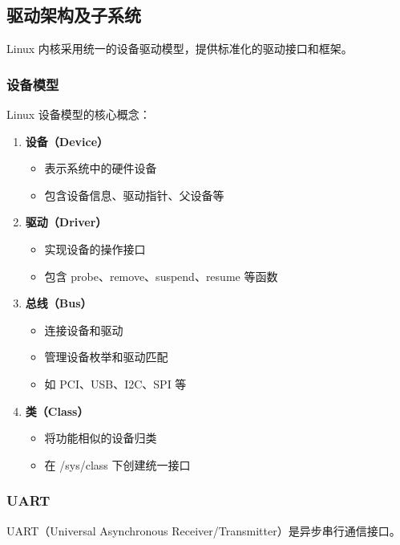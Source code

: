 \subsection{驱动架构及子系统}

Linux 内核采用统一的设备驱动模型，提供标准化的驱动接口和框架。

\subsubsection{设备模型}

Linux 设备模型的核心概念：

\begin{enumerate}
  \item \textbf{设备（Device）}
    \begin{itemize}
      \item 表示系统中的硬件设备
      \item 包含设备信息、驱动指针、父设备等
    \end{itemize}

  \item \textbf{驱动（Driver）}
    \begin{itemize}
      \item 实现设备的操作接口
      \item 包含 probe、remove、suspend、resume 等函数
    \end{itemize}

  \item \textbf{总线（Bus）}
    \begin{itemize}
      \item 连接设备和驱动
      \item 管理设备枚举和驱动匹配
      \item 如 PCI、USB、I2C、SPI 等
    \end{itemize}

  \item \textbf{类（Class）}
    \begin{itemize}
      \item 将功能相似的设备归类
      \item 在 /sys/class 下创建统一接口
    \end{itemize}
\end{enumerate}

\subsubsection{UART}

UART（Universal Asynchronous Receiver/Transmitter）是异步串行通信接口。

